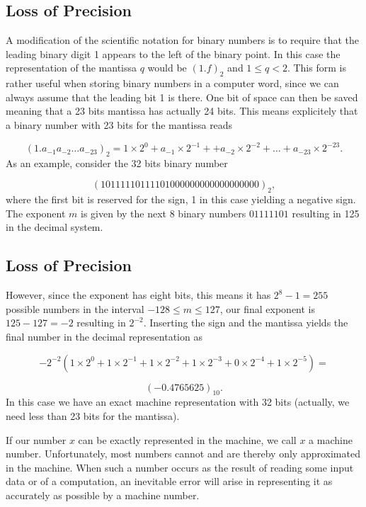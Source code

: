 \documentclass[%
twoside,                 %
final,                   %
10pt]{article}
\newenvironment{block_mdfboxadmon}[1][]{
\begin{block_mdfboxmdframed}[frametitle=#1]
}
{
\end{block_mdfboxmdframed}
}
\begin{document}
\subsection{Loss of Precision}


\begin{block_mdfboxadmon}
A modification of the scientific notation for binary numbers is to
require that the leading binary digit 1 appears to the left of the binary point.
In this case the representation of the mantissa $q$ would be
$(1.f)_2$ and $ 1 \le q < 2$. This form is rather useful when storing
binary numbers in a computer word, since we can always assume that the leading
bit 1 is there. One bit of space can then be saved meaning that a 23 bits
mantissa has actually 24 bits. This means explicitely that a binary number with 23 bits
for the mantissa reads

\begin{equation}
(1.a_{-1}a_{-2}\dots a_{-23})_2=1\times 2^0+a_{-1}\times 2^{-1}+
+a_{-2}\times 2^{-2}+\dots+a_{-23}\times 2^{-23}.
\end{equation}
As an example, consider the 32 bits binary number

\[
(10111110111101000000000000000000)_2,
\]
where the first bit is reserved for the sign, 1 in this case yielding a
negative sign. The exponent $m$ is given by the next 8 binary numbers
$01111101$ resulting in 125 in the decimal system.
\end{block_mdfboxadmon}



\subsection{Loss of Precision}


\begin{block_mdfboxadmon}
However, since the
exponent has eight bits, this means it has  $2^8-1=255$ possible numbers in the interval
$-128 \le m \le 127$, our final
exponent is $125-127=-2$ resulting in $2^{-2}$.
Inserting the sign and the mantissa yields the final number in the decimal representation as

\[
 -2^{-2}\left(1\times 2^0+1\times 2^{-1}+
1\times 2^{-2}+1\times 2^{-3}+0\times 2^{-4}+1\times 2^{-5}\right)=\]

\[
(-0.4765625)_{10}.
\]
In this case we have an exact machine representation with 32 bits (actually, we need less than
23 bits for the mantissa).

If our number $x$ can be exactly represented in the machine, we call
$x$ a machine number. Unfortunately, most numbers cannot  and are thereby
only approximated in the machine. When such a number occurs as the result
of reading some input data or of a computation, an inevitable error
will arise in representing it as accurately as possible by
a machine number.
\end{block_mdfboxadmon}
\end{document}
